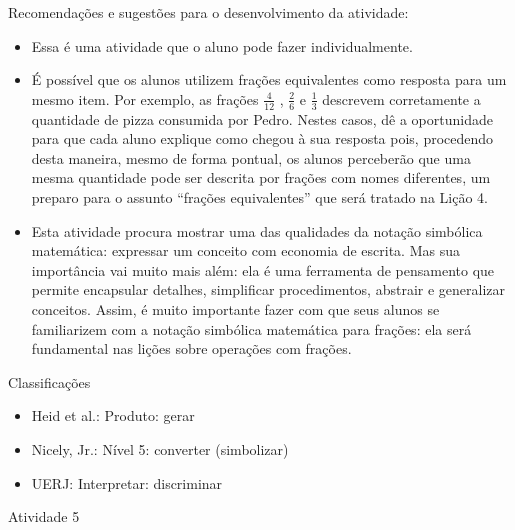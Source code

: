 \documentclass[oneside]{book}
\begin{document}
\begin{multicols}{2}
  Recomendações e sugestões para o desenvolvimento da atividade:
\begin{itemize} %
    \item       Essa é uma atividade que o aluno pode fazer individualmente.
    \item       É possível que os alunos utilizem frações equivalentes como resposta para um mesmo item. Por exemplo, as frações       $\frac{4}{12}$      ,       $\frac{2}{6}$       e       $\frac{1}{3}$        descrevem corretamente a quantidade de pizza consumida por Pedro. Nestes casos, dê a oportunidade para que cada aluno explique como chegou à sua resposta pois, procedendo desta maneira, mesmo de forma pontual, os alunos perceberão que uma mesma quantidade pode ser descrita por frações com nomes diferentes, um preparo para o assunto       ``frações equivalentes''       que será tratado na Lição 4.
    \item       Esta atividade procura mostrar uma das qualidades da notação simbólica matemática: expressar um conceito com economia de escrita. Mas sua importância vai muito mais além: ela é uma ferramenta de pensamento que permite encapsular detalhes, simplificar procedimentos, abstrair e generalizar conceitos. Assim, é muito importante fazer com que seus alunos se familiarizem com a notação simbólica matemática para frações: ela será fundamental nas lições sobre operações com frações.
\end{itemize} %


  Classificações
\begin{itemize} %
    \item       Heid et al.: Produto: gerar
    \item       Nicely, Jr.: Nível 5: converter (simbolizar)
    \item       UERJ: Interpretar: discriminar
\end{itemize} %





\begin{resposta*}{Atividade 5}




\end{resposta*}
\end{multicols}
\end{document}
